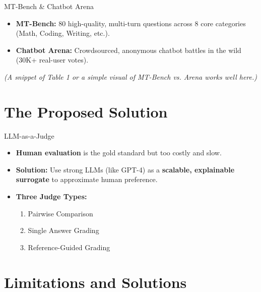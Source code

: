 \documentclass[10pt]{beamer}
\begin{document}
\begin{frame}{MT-Bench \& Chatbot Arena}
  \begin{itemize}
    \item \textbf{MT-Bench:} 80 high-quality, multi-turn questions across 8 core categories (Math, Coding, Writing, etc.).
    \item \textbf{Chatbot Arena:} Crowdsourced, anonymous chatbot battles in the wild (30K+ real-user votes).
  \end{itemize}
  \vspace{0.3cm}
  \textit{(A snippet of Table 1 or a simple visual of MT-Bench vs. Arena works well here.)}
\end{frame}

\section{The Proposed Solution}

\begin{frame}{LLM-as-a-Judge}
  \begin{itemize}
    \item \textbf{Human evaluation} is the gold standard but too costly and slow.
    \item \textbf{Solution:} Use strong LLMs (like GPT-4) as a \textbf{scalable, explainable surrogate} to approximate human preference.
    \item \textbf{Three Judge Types:} 
    \begin{enumerate}
        \item Pairwise Comparison
        \item Single Answer Grading
        \item Reference-Guided Grading
    \end{enumerate}
  \end{itemize}
\end{frame}

\section{Limitations and Solutions}
\end{document}
